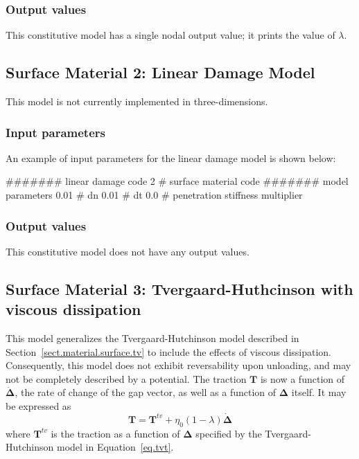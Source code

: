 \subsubsection{Output values}
This constitutive model has a single nodal output value; it prints the 
value of $\lambda$.

\subsection{Surface Material 2: Linear Damage Model}

This model is not currently implemented in three-dimensions.

\subsubsection{Input parameters}
An example of input parameters for the linear damage model is shown 
below:
\begin{inputfile}
####### linear damage code
2     # surface material code
####### model parameters
0.01  # dn
0.01  # dt
0.0   # penetration stiffness multiplier
\end{inputfile}

\subsubsection{Output values}
This constitutive model does not have any output values.

\subsection{Surface Material 3: Tvergaard-Huthcinson with viscous dissipation}
\label{sect.material.surface.tvvisc}
This model generalizes the Tvergaard-Hutchinson model 
described in Section~\ref{sect.material.surface.tv} to include the effects of 
viscous dissipation. Consequently, this model does not exhibit reversability 
upon unloading, and may not be completely described by a potential. 
The traction $\mathbf{T}$ is now a function of $\dot{\mathbf{\Delta}}$, 
the rate of change of the gap vector, as well as a function of $\mathbf{\Delta}$ itself.
It may be expressed as 
\begin{equation}
\mathbf{T} = \mathbf{T}^{tv} + \eta_0 (1-\lambda) \dot{\mathbf{\Delta}}
\end{equation}
where $\mathbf{T}^{tv}$ is the traction as a function of $\mathbf{\Delta}$ specified by
the Tvergaard-Hutchinson model in Equation~\eqref{eq.tvt}. 

